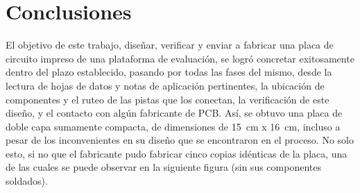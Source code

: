 \section{Conclusiones} \label{conclusiones}
\thispagestyle{plain}

\divider

El objetivo de este trabajo, diseñar, verificar y enviar a fabricar una placa de circuito impreso de una plataforma de evaluación, se logró concretar exitosamente dentro del plazo establecido, pasando por todas las fases del mismo, desde la lectura de hojas de datos y notas de aplicación pertinentes, la ubicación de componentes y el ruteo de las pistas que los conectan, la verificación de este diseño, y el contacto con algún fabricante de PCB. Así, se obtuvo una placa de doble capa sumamente compacta, de dimensiones de \SI[]{15}[]{\centi\metre} x \SI[]{16}[]{\centi\metre}, incluso a pesar de los inconvenientes en su diseño que se encontraron en el proceso. No solo esto, si no que el fabricante pudo fabricar cinco copias idénticas de la placa, una de las cuales se puede observar en la siguiente figura (sin sus componentes soldados).\\

